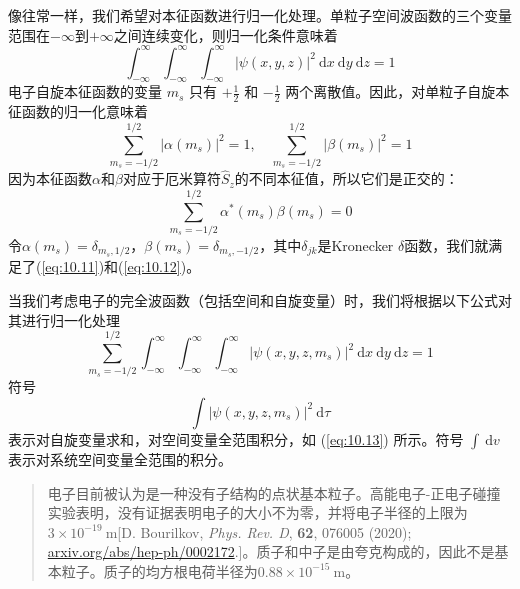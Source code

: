     像往常一样，我们希望对本征函数进行归一化处理。单粒子空间波函数的三个变量范围在$-\infty$到$+\infty$之间连续变化，则归一化条件意味着
    \begin{equation*}
        \int_{-\infty}^{\infty} \int_{-\infty}^{\infty} \int_{-\infty}^{\infty} \left|\psi\left(x, y, z\right)\right|^2\: \mathrm{d}x\: \mathrm{d}y\: \mathrm{d}z = 1
    \end{equation*}
    电子自旋本征函数的变量 $m_s$ 只有 $+\frac{1}{2}$ 和 $-\frac{1}{2}$ 两个离散值。因此，对单粒子自旋本征函数的归一化意味着
    \begin{equation}
        \sum_{m_{s}=-1/2}^{1/2} \left|\alpha \left(m_{s}\right)\right|^{2} = 1, \quad \sum_{m_{s}=-1/2}^{1/2} \left|\beta \left(m_{s}\right)\right|^{2} = 1
        \label{eq:10.11}
    \end{equation}
    因为本征函数$\alpha$和$\beta$对应于厄米算符$\hat{S}_z$的不同本征值，所以它们是正交的：
    \begin{equation}
        \sum_{m_{s}=-1/2}^{1/2} \alpha^ * \left(m_{s}\right) \beta \left(m_{s}\right) = 0
        \label{eq:10.12}
    \end{equation}
    令$\alpha\left(m_s\right) = \delta_{m_s, 1/2}$，$\beta\left(m_s\right) = \delta_{m_s, -1/2}$，其中$\delta_{jk}$是Kronecker $\delta$函数，我们就满足了(\ref{eq:10.11})和(\ref{eq:10.12})。

    当我们考虑电子的完全波函数（包括空间和自旋变量）时，我们将根据以下公式对其进行归一化处理
    \begin{equation}
        \boxed{
            \sum_{m_s=-1/2}^{1/2} \int_{-\infty}^{\infty} \int_{-\infty}^{\infty} \int_{-\infty}^{\infty} \left|\psi\left(x, y, z, m_s\right)\right|^2 \:\mathrm{d}x \:\mathrm{d}y \:\mathrm{d}z = 1
        }
        \label{eq:10.13}
    \end{equation}
    符号
    \begin{equation*}
        \int \left|\psi\left(x, y, z, m_s\right)\right|^2 \:\mathrm{d}\tau
    \end{equation*}
    表示对自旋变量求和，对空间变量全范围积分，如 (\ref{eq:10.13}) 所示。符号 $\int \:\mathrm{d}v$ 表示对系统空间变量全范围的积分。

    \begin{quote}
        \small
        \noindent
        电子目前被认为是一种没有子结构的点状基本粒子。高能电子-正电子碰撞实验表明，没有证据表明电子的大小不为零，并将电子半径的上限为$3 \times 10^{-19} \:\mathrm{m}$[D. Bourilkov, \textit{Phys. Rev. D}, \textbf{62}, 076005 (2020); \url{arxiv.org/abs/hep-ph/0002172}.]。质子和中子是由夸克构成的，因此不是基本粒子。质子的均方根电荷半径为$0.88 \times 10^{-15} \:\mathrm{m}$。
    \end{quote}

